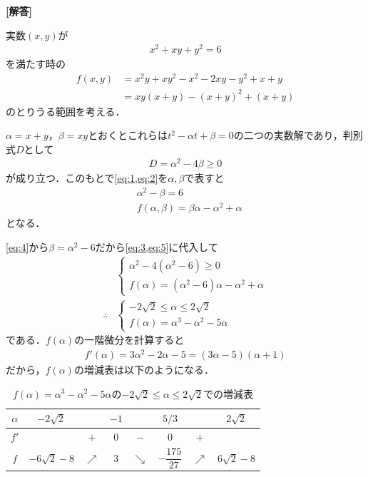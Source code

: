 \documentclass[../../main.tex]{subfiles}
\begin{document}
\begin{oframed}
  
\end{oframed}

{\bf [解答]}

実数$(x,y)$が
\begin{align}
  x^2+xy+y^2=6 \label{eq:1}
\end{align}
を満たす時の
\begin{align}
  f(x,y)
  &= x^2y+xy^2-x^2-2xy-y^2+x+y \\
  &= xy(x+y)-(x+y)^2+(x+y) \label{eq:2}
\end{align}
のとりうる範囲を考える．

$\alpha=x+y$，$\beta=xy$とおくとこれらは$t^2-\alpha t+\beta=0$の二つの実数解であり，判別式$D$として
\begin{align}
  D = \alpha^2-4\beta \ge0 \label{eq:3}
\end{align}
が成り立つ．このもとで\cref{eq:1,eq:2}を$\alpha,\beta$で表すと
\begin{align}
  & \alpha^2-\beta=6 \label{eq:4} \\
  & f(\alpha,\beta)=\beta\alpha-\alpha^2+\alpha \label{eq:5}
\end{align}
となる．

\cref{eq:4}から$\beta=\alpha^2-6$だから\cref{eq:3,eq:5}に代入して
\begin{align}
  &
  \begin{cases}
    \alpha^2-4(\alpha^2-6)\ge0 \\
    f(\alpha)=(\alpha^2-6)\alpha-\alpha^2+\alpha
  \end{cases} \\
  \therefore
  &
  \begin{cases}
    -2\sqrt{2} \le \alpha \le 2\sqrt{2} \\
    f(\alpha)=\alpha^3-\alpha^2-5\alpha
  \end{cases}
\end{align}
である．$f(\alpha)$の一階微分を計算すると
\begin{align}
  f'(\alpha)=3\alpha^2-2\alpha-5=(3\alpha-5)(\alpha+1)
\end{align}
だから，$f(\alpha)$の増減表は以下のようになる．

\begin{table}[htb]
  \centering
  \caption{$f(\alpha)=\alpha^3-\alpha^2-5\alpha$の$-2\sqrt{2} \le \alpha \le 2\sqrt{2}$での増減表}
  \begin{tabular}{c|ccccccc}
    $\alpha$ & $-2\sqrt{2}$ & & $-1$ & & $5/3$ & & $2\sqrt{2}$ \\
    \hline
    $f'$ & & $+$ & $0$ & $-$ & $0$ & $+$ & \\
    \hline
    $f$ & $-6\sqrt{2}-8$ & $\nearrow$ & $3$ & $\searrow$ & $-\dfrac{175}{27}$ & $\nearrow$ & $6\sqrt{2}-8$ \\
  \end{tabular}
\end{table}
\end{document}
